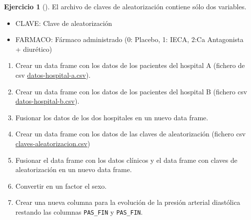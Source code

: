 \documentclass[
  a4paper,
]{scrreport}
\providecommand{\tightlist}{%
  \setlength{\itemsep}{0pt}\setlength{\parskip}{0pt}}\usepackage{longtable,booktabs,array}
\theoremstyle{definition}
\newtheorem{exercise}{Ejercicio}[chapter]
\theoremstyle{remark}
\begin{document}
\begin{exercise}[]
El archivo de claves de aleatorización contiene sólo dos variables.

\begin{itemize}
\tightlist
\item
  CLAVE: Clave de aleatorización
\item
  FARMACO: Fármaco administrado (0: Placebo, 1: IECA, 2:Ca Antagonista +
  diurético)
\end{itemize}

\begin{enumerate}
\def\labelenumi{\alph{enumi}.}
\item
  Crear un data frame con los datos de los pacientes del hospital A
  (fichero de csv
  \href{datos/hipertension/datos-hospital-a.csv}{datos-hospital-a.csv}).
\item
  Crear un data frame con los datos de los pacientes del hospital B
  (fichero csv
  \href{datos/hipertension/datos-hospital-b.csv}{datos-hospital-b.csv}).
\item
  Fusionar los datos de los dos hospitales en un nuevo data frame.
\item
  Crear un data frame con los datos de las claves de aleatorización
  (fichero csv
  \href{datos/hipertension/claves-aleatorizacion.csv}{claves-aleatorizacion.csv})
\item
  Fusionar el data frame con los datos clínicos y el data frame con
  claves de aleatorización en un nuevo data frame.
\item
  Convertir en un factor el sexo.
\item
  Crear una nueva columna para la evolución de la presión arterial
  diastólica restando las columnas \texttt{PAS\_FIN} y
  \texttt{PAS\_FIN}.
\end{enumerate}

\end{exercise}
\end{document}
